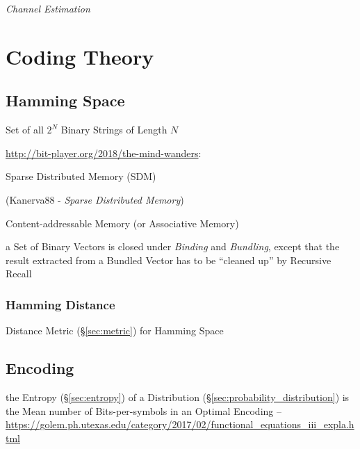 \emph{Channel Estimation}



\section{Coding Theory}\label{sec:coding_theory}

\subsection{Hamming Space}\label{sec:hamming_space}

Set of all $2^N$ Binary Strings of Length $N$


\url{http://bit-player.org/2018/the-mind-wanders}:

Sparse Distributed Memory (SDM)

(Kanerva88 - \emph{Sparse Distributed Memory})

Content-addressable Memory (or Associative Memory)

a Set of Binary Vectors is closed under \emph{Binding} and \emph{Bundling},
except that the result extracted from a Bundled Vector has to be ``cleaned up''
by Recursive Recall



\subsubsection{Hamming Distance}\label{sec:hamming_distance}

Distance Metric (\S\ref{sec:metric}) for Hamming Space



\subsection{Encoding}\label{sec:encoding}

the Entropy (\S\ref{sec:entropy}) of a Distribution
(\S\ref{sec:probability_distribution}) is the Mean number of
Bits-per-symbols in an Optimal Encoding --
\url{https://golem.ph.utexas.edu/category/2017/02/functional_equations_iii_expla.html}

